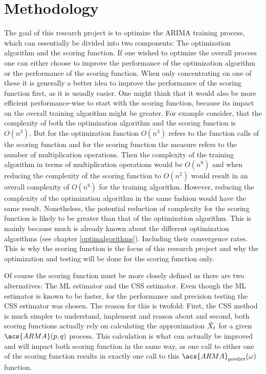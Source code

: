 \chapter{Methodology}\label{methodology}

The goal of this research project is to optimize the \acl{ARIMA} training process, which can essentially be divided into two components: The optimization algorithm and the scoring function.
If one wished to optimize the overall process one can either choose to improve the performance of the optimization algorithm or the performance of the scoring function. When only concentrating on one of these it is generally a better idea to improve the performance of the scoring function first, as it is usually easier. One might think that it would also be more efficient performance-wise to start with the scoring function, because its impact on the overall training algorithm might be greater. For example consider, that the complexity of both the optimization algorithm and the scoring function is $O(n^3)$. But for the optimization function $O(n^3)$ refers to the function calls of the scoring function and for the scoring function the measure refers to the number of multiplication operations. Then the complexity of the training algorithm in terms of multiplication operations would be $O(n^9)$ and when reducing the complexity of the scoring function to $O(n^2)$ would result in an overall complexity of $O(n^6)$ for the training algorithm. However, reducing the complexity of the optimization algorithm in the same fashion would have the same result. Nonetheless, the potential reduction of complexity for the scoring function is likely to be greater than that of the optimization algorithm. This is mainly because much is already known about the different optimization algorithms (see chapter \ref{optimalgorithms}). Including their convergence rates. This is why the scoring function is the focus of this research project and why the optimization and testing will be done for the scoring function only.

Of course the scoring function must be more closely defined as there are two alternatives: The \acl{ML} estimator and the \acl{CSS} estimator. Even though the \acs{ML} estimator is known to be faster, for the performance and precision testing the \acs{CSS} estimator was chosen. The reason for this is twofold: First, the \acs{CSS} method is much simpler to understand, implement and reason about and second, both scoring functions actually rely on calculating the approximation $\Hat{X}_t$ for a given $\acs{ARMA}(p,q)$ process. This calculation is what can actually be improved and will impact both scoring function in the same way, as one call to either one of the scoring function results in exactly one call to this $\acs{ARMA}_{\textrm{predict}}(\omega)$ function.

